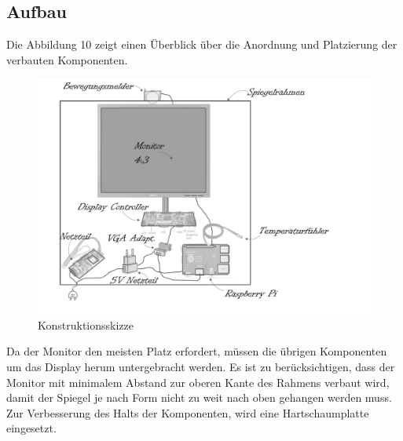\subsection{Aufbau}
Die Abbildung 10 zeigt einen Überblick über die Anordnung und Platzierung der verbauten Komponenten. 
\begin{figure}
	\includegraphics[scale=0.5, trim=0mm 10mm 60mm 10mm]{bilder/smartMirrorExplosionsskizze.pdf}
	\caption{Konstruktionsskizze}
\end{figure}
Da der Monitor den meisten Platz erfordert, müssen die übrigen Komponenten um das Display herum untergebracht werden. Es ist zu berücksichtigen, dass der Monitor mit  minimalem Abstand zur oberen Kante des Rahmens verbaut wird, damit der Spiegel je nach Form nicht zu weit nach oben gehangen werden muss. Zur Verbesserung des Halts der Komponenten, wird eine Hartschaumplatte eingesetzt. 

